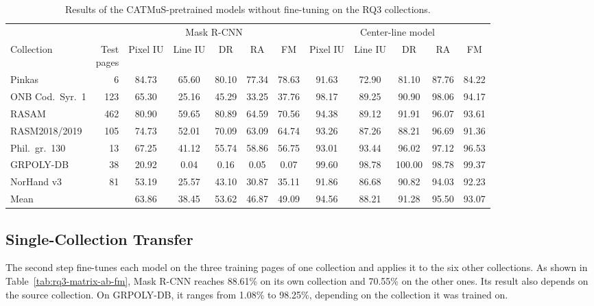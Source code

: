 \begin{table}[htbp]
    \centering
    \caption{Results of the CATMuS-pretrained models without fine-tuning on the RQ3 collections.}
    \label{tab:rq3-zeroshot}\label{tab:rq3-zeroshot-center-line}
    \scriptsize
    \setlength{\tabcolsep}{2pt}
    \begin{tabular*}{\textwidth}{@{\extracolsep{\fill}}lrcccccccccc@{}}
        \toprule
        & & \multicolumn{5}{c}{Mask R-CNN} & \multicolumn{5}{c}{Center-line model} \\
        \cmidrule(lr){3-7}\cmidrule(l){8-12}
        Collection & \shortstack{Test\\pages} & Pixel IU & Line IU & DR & RA & FM & Pixel IU & Line IU & DR & RA & FM \\
        \midrule
        Pinkas & 6 & 84.73 & 65.60 & 80.10 & 77.34 & 78.63 & 91.63 & 72.90 & 81.10 & 87.76 & 84.22 \\
        ONB Cod.\ Syr.\ 1 & 123 & 65.30 & 25.16 & 45.29 & 33.25 & 37.76 & 98.17 & 89.25 & 90.90 & 98.06 & 94.17 \\
        RASAM & 462 & 80.90 & 59.65 & 80.89 & 64.59 & 70.56 & 94.38 & 89.12 & 91.91 & 96.07 & 93.61 \\
        RASM2018/2019 & 105 & 74.73 & 52.01 & 70.09 & 63.09 & 64.74 & 93.26 & 87.26 & 88.21 & 96.69 & 91.36 \\
        Phil.\ gr.\ 130 & 13 & 67.25 & 41.12 & 55.74 & 58.86 & 56.75 & 93.01 & 93.44 & 96.02 & 97.12 & 96.53 \\
        GRPOLY-DB & 38 & 20.92 & 0.04 & 0.16 & 0.05 & 0.07 & 99.60 & 98.78 & 100.00 & 98.78 & 99.37 \\
        NorHand v3 & 81 & 53.19 & 25.57 & 43.10 & 30.87 & 35.11 & 91.86 & 86.68 & 90.82 & 94.03 & 92.23 \\
        \midrule
        Mean &  & 63.86 & 38.45 & 53.62 & 46.87 & 49.09 & 94.56 & 88.21 & 91.28 & 95.50 & 93.07 \\
        \bottomrule
    \end{tabular*}
\end{table}

\FloatBarrier
\subsection{Single-Collection Transfer}
\label{sec:results-rq3-protocol-a}

The second step fine-tunes each model on the three training pages of one collection and applies it to the six other collections. As shown in Table~\ref{tab:rq3-matrix-ab-fm}, Mask R-CNN reaches 88.61\% on its own collection and 70.55\% on the other ones. Its result also depends on the source collection. On GRPOLY-DB, it ranges from 1.08\% to 98.25\%, depending on the collection it was trained on.

